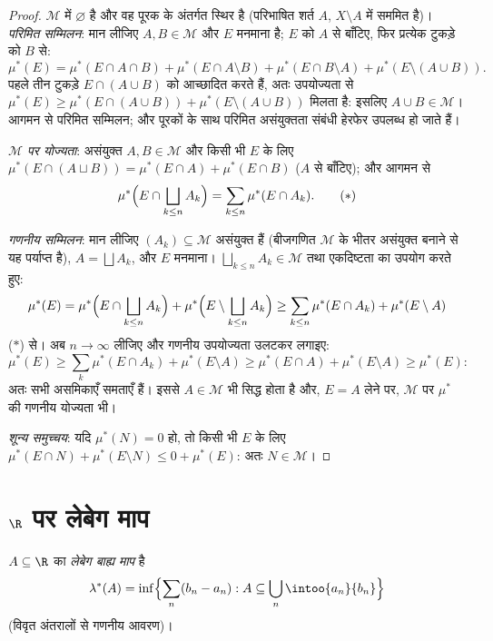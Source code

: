 \begin{proof}
$\mathcal M$ में $\varnothing$ है और वह पूरक के अंतर्गत स्थिर है (परिभाषित शर्त
$A$, $X\setminus A$ में सममित है)। \emph{परिमित सम्मिलन}: मान लीजिए
$A, B \in \mathcal
M$ और $E$ मनमाना है; $E$ को $A$ से बाँटिए, फिर प्रत्येक
टुकड़े को $B$ से:
\[
\mu^*(E) = \mu^*(E\cap A\cap B) + \mu^*(E\cap A\setminus B) +
\mu^*(E\cap B\setminus A) + \mu^*(E\setminus(A\cup B)).
\]
पहले तीन टुकड़े $E \cap (A \cup B)$ को आच्छादित करते हैं, अतः उपयोज्यता से
$\mu^*(E) \geq \mu^*(E\cap(A\cup B)) +
\mu^*(E\setminus(A\cup B))$ मिलता है: इसलिए $A \cup B \in \mathcal M$। आगमन से परिमित सम्मिलन; और पूरकों के
साथ परिमित असंयुक्तता संबंधी हेरफेर उपलब्ध हो जाते हैं।

\emph{$\mathcal M$ पर योज्यता}: असंयुक्त $A, B \in
\mathcal M$ और किसी भी $E$ के लिए
$\mu^*(E\cap(A\sqcup B)) = \mu^*(E\cap
A) + \mu^*(E \cap B)$ ($A$ से बाँटिए); और आगमन से
\[
\mu^*\Bigl(E \cap \bigsqcup_{k\leq n}A_k\Bigr)
= \sum_{k\leq n}\mu^*(E\cap A_k).
\tag{$*$}
\]

\emph{गणनीय सम्मिलन}: मान लीजिए $(A_k) \subseteq \mathcal M$ असंयुक्त हैं (बीजगणित
$\mathcal M$ के भीतर असंयुक्त बनाने से यह पर्याप्त है), $A = \bigsqcup A_k$, और $E$
मनमाना। $\bigsqcup_{k\leq n}A_k \in \mathcal M$ तथा एकदिष्टता का उपयोग करते हुए:
\[
\mu^*(E) = \mu^*\Bigl(E\cap\bigsqcup_{k\leq n}A_k\Bigr) +
\mu^*\Bigl(E\setminus\bigsqcup_{k\leq n}A_k\Bigr)
\geq \sum_{k \leq n}\mu^*(E\cap A_k) + \mu^*(E\setminus A)
\]
($*$) से। अब $n \to \infty$ लीजिए और गणनीय उपयोज्यता उलटकर लगाइए:
\[
\mu^*(E) \geq \sum_{k}\mu^*(E\cap A_k) + \mu^*(E\setminus A)
\geq \mu^*(E \cap A) + \mu^*(E\setminus A) \geq \mu^*(E):
\]
अतः सभी असमिकाएँ समताएँ हैं। इससे $A \in
\mathcal M$ भी सिद्ध होता है और,
$E = A$ लेने पर, $\mathcal M$ पर $\mu^*$ की गणनीय योज्यता भी।

\emph{शून्य समुच्चय}: यदि $\mu^*(N) = 0$ हो, तो किसी भी $E$ के लिए
$\mu^*(E \cap N) + \mu^*(E\setminus N) \leq 0 + \mu^*(E)$: अतः $N \in \mathcal M$।
\end{proof}

\section{\texorpdfstring{$\R$}{R} पर लेबेग माप}

\begin{definition}\label{def:b3:measure:lebesgueouter}
$A
\subseteq \R$ का \emph{लेबेग बाह्य माप} है
\[
\lambda^*(A) = \inf\Bigl\{\sum_{n} (b_n - a_n) :
A \subseteq \bigcup_n \intoo{a_n}{b_n}\Bigr\}
\]
(विवृत अंतरालों से गणनीय आवरण)।
\end{definition}

